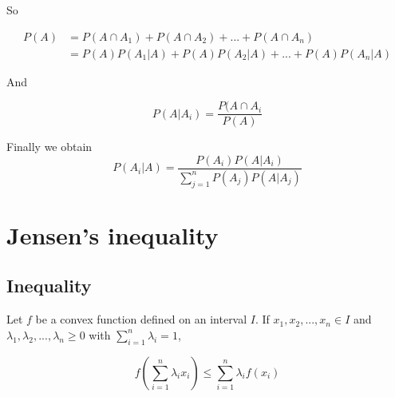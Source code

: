 So

\begin{align*}
 P(A) &= P(A\cap A_1) + P(A\cap A_2) + ... + P(A\cap A_n)\\
      &= P(A)P(A_1|A) + P(A)P(A_2|A) + ... + P(A)P(A_n|A)
\end{align*}

And

\begin{equation*}
P(A|A_i) = \frac{P(A \cap A_i}{P(A)}
\end{equation*}

Finally we obtain
\begin{equation*}
P(A_i|A)= \frac{P(A_i)P(A|A_i)}{\sum_{j=1}^n P(A_j)P(A|A_j)}
\end{equation*}

\section{Jensen's inequality}\label{f:Jensen}
\subsection{Inequality}
Let $f$ be a convex function defined on an interval $I$. If $x_1,x_2,...,x_n \in I$ and $\lambda_1, \lambda_2, ... , \lambda_n \geq 0$ with $\sum_{i=1}^n \lambda_i = 1$,

  \begin{equation*}
  f(\sum_{i=1}^n \lambda_i x_i) \leq \sum_{i=1}^n \lambda_i f(x_i)
  \end{equation*}

